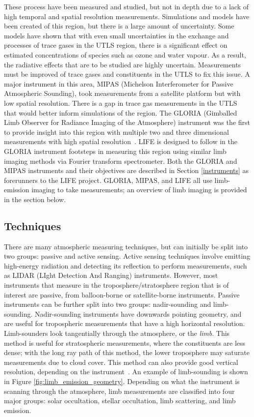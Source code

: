 These process have been measured and studied, but not in depth due to a lack of high temporal and spatial resolution measurements. Simulations and models have been created of this region, but there is a large amount of uncertainty. Some models have shown that with even small uncertainties in the exchange and processes of trace gases in the UTLS region, there is a significant effect on estimated concentrations of species such as ozone and water vapour. As a result, the radiative effects that are to be studied are highly uncertain. Measurements must be improved of trace gases and constituents in the UTLS to fix this issue. A major instrument in this area, MIPAS (Michelson Interferometer for Passive Atmospheric Sounding), took measurements from a satellite platform but with low spatial resolution. There is a gap in trace gas measurements in the UTLS that would better inform simulations of the region. The GLORIA (Gimballed Limb Observer for Radiance Imaging of the Atmosphere) instrument was the first to provide insight into this region with multiple two and three dimensional measurements with high spatial resolution~\citep{GLORIA_objectives}. LIFE is designed to follow in the GLORIA instrument footsteps in measuring this region using similar limb imaging methods via Fourier transform spectrometer. Both the GLORIA and MIPAS instruments and their objectives are described in Section \ref{instruments} as forerunners to the LIFE project. GLORIA, MIPAS, and LIFE all use limb-emission imaging to take measurements; an overview of limb imaging is provided in the section below.

\subsection{Techniques} \label{techniques}
There are many atmospheric measuring techniques, but can initially be split into two groups: passive and active sensing. Active sensing techniques involve emitting high-energy radiation and detecting its reflection to perform measurements, such as LIDAR (LIght Detection And Ranging) instruments. However, most instruments that measure in the troposphere/stratosphere region that is of interest are passive, from balloon-borne or satellite-borne instruments. Passive instruments can be further split into two groups: nadir-sounding and limb-sounding. Nadir-sounding instruments have downwards pointing geometry, and are useful for tropospheric measurements that have a high horizontal resolution. Limb-sounders look tangentially through the atmosphere, or the \textit{limb}. This method is useful for stratospheric measurements, where the constituents are less dense; with the long ray path of this method, the lower troposphere may saturate measurements due to cloud cover. This method can also provide good vertical resolution, depending on the instrument~\citep{SPARC}. An example of limb-sounding is shown in Figure \ref{fig:limb_emission_geometry}. Depending on what the instrument is scanning through the atmosphere, limb measurements are classified into four major groups: solar occultation, stellar occultation, limb scattering, and limb emission.

